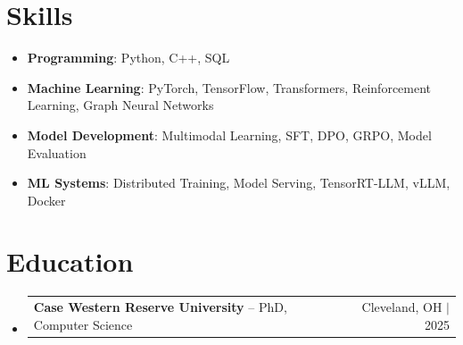 \documentclass[letterpaper,13pt]{article}
\makeatletter
\newcommand{\resumeProjectHeading}[2]{
    \item
    \begin{tabular*}{\textwidth}{l@{\extracolsep{\fill}}r}
      \small#1 & #2 \\
    \end{tabular*}\vspace{-4pt}
}
\newcommand{\resumeSubHeadingListStart}{\begin{itemize}[leftmargin=0in, label={}]}
\newcommand{\resumeSubHeadingListEnd}{\end{itemize}}
\makeatother
\begin{document}
\section{Skills}
\vspace{0.02cm}
\begin{itemize}[leftmargin=0.15in, label={}, itemsep=2pt, topsep=1pt]
  \item \textbf{Programming}: Python, C++, SQL
  \item \textbf{Machine Learning}: PyTorch, TensorFlow, Transformers, Reinforcement Learning, Graph Neural Networks
  \item \textbf{Model Development}: Multimodal Learning, SFT, DPO, GRPO, Model Evaluation
  \item \textbf{ML Systems}: Distributed Training, Model Serving, TensorRT-LLM, vLLM, Docker
\end{itemize}
\vspace{0.02cm}

\section{Education}
\resumeSubHeadingListStart
  \resumeProjectHeading{\textbf{Case Western Reserve University} -- PhD, Computer Science}{Cleveland, OH $|$ 2025}
\resumeSubHeadingListEnd
\end{document}
